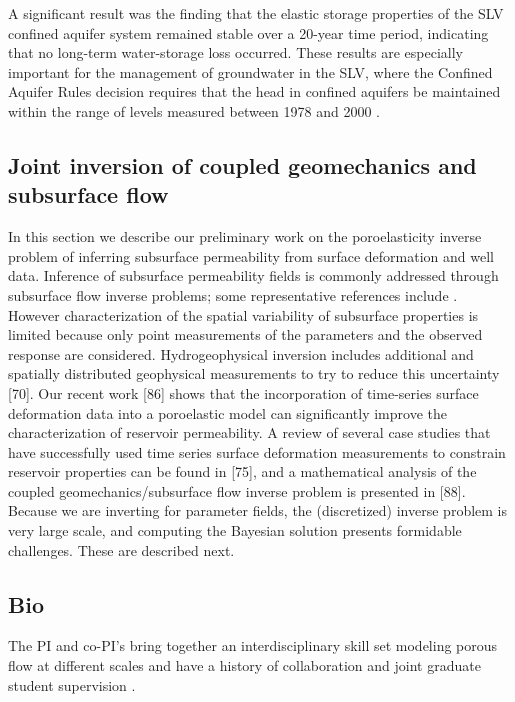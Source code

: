 \documentclass[11pt,final]{article}%
\renewcommand{\citep}{\cite}
\begin{document}
A significant result was the finding that the elastic storage properties of the SLV confined aquifer system remained stable over a 20-year time period, indicating that no long-term water-storage loss occurred. These results are especially important for the management of groundwater in the SLV, where the Confined Aquifer Rules decision requires that the head in confined aquifers be maintained within the range of levels measured between 1978 and 2000 \citep{Rules}.













\subsection{Joint inversion of coupled geomechanics and subsurface flow}
In this section we describe our preliminary work on the poroelasticity inverse problem of inferring subsurface permeability from surface deformation and well data. Inference of subsurface permeability fields is commonly addressed through
subsurface flow inverse problems; some representative references include \citep{Carrera1986a,Carrera1986b,Carrera1986c,McLaughlin1996,Bohling2010,Cardiff2011,Cardiff2012,Berg2015,Yoon2017}. 
However characterization of the spatial variability of subsurface properties is limited because only point measurements of the parameters and the observed response are considered. Hydrogeophysical inversion includes additional and spatially distributed geophysical measurements to try to reduce this
uncertainty [70]. Our recent work [86] shows that the incorporation of time-series surface deformation data into a poroelastic model can significantly improve the characterization of reservoir permeability. A review of several case studies that have successfully used time series surface deformation measurements
to constrain reservoir properties can be found in [75], and a mathematical analysis of the coupled geomechanics/subsurface flow inverse problem is presented in [88]. Because we are inverting for parameter fields, the (discretized) inverse problem is very large scale, and computing the Bayesian solution presents formidable challenges. These are described next.

\subsection{Bio}
The PI and co-PI's bring together an interdisciplinary skill set modeling porous flow at different scales and have a history of collaboration and joint graduate student supervision \cite{Ghanbarzadeh2014,Ghanbarzadeh2015a,Ghanbarzadeh2015b,Ghanbarzadeh2017}.
\end{document}
